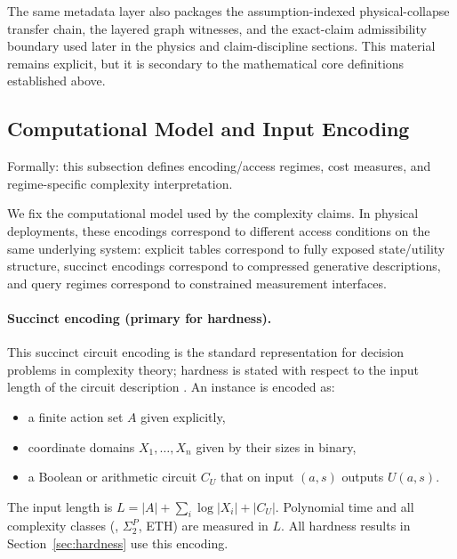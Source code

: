 The same metadata layer also packages the assumption-indexed physical-collapse transfer chain, the layered graph witnesses, and the exact-claim admissibility boundary used later in the physics and claim-discipline sections. This material remains explicit, but it is secondary to the mathematical core definitions established above.

\subsection{Computational Model and Input Encoding}\label{sec:encoding}

Formally: this subsection defines encoding/access regimes, cost measures, and regime-specific complexity interpretation.

We fix the computational model used by the complexity claims.
In physical deployments, these encodings correspond to different access conditions on the same underlying system: explicit tables correspond to fully exposed state/utility structure, succinct encodings correspond to compressed generative descriptions, and query regimes correspond to constrained measurement interfaces.

\paragraph{Succinct encoding (primary for hardness).}
This succinct circuit encoding is the standard representation for decision problems in complexity theory; hardness is stated with respect to the input length of the circuit description \cite{arora2009computational,papadimitriou1994complexity}.
An instance is encoded as:
\begin{itemize}
\item a finite action set $A$ given explicitly,
\item coordinate domains $X_1,\ldots,X_n$ given by their sizes in binary,
\item a Boolean or arithmetic circuit $C_U$ that on input $(a,s)$ outputs $U(a,s)$.
\end{itemize}
The input length is $L = |A| + \sum_i \log |X_i| + |C_U|$. Polynomial time and all complexity classes (\coNP, $\Sigma_2^P$, ETH) are measured in $L$. All hardness results in Section~\ref{sec:hardness} use this encoding.

